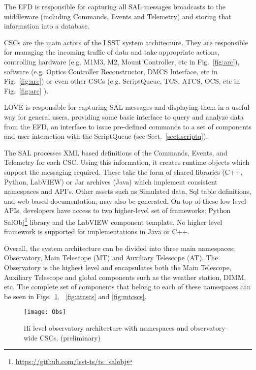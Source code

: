The EFD is responsible for capturing all SAL messages broadcasts to the middleware (including Commands, Events and Telemetry) and storing that information into a database.

CSCs are the main actors of the LSST system architecture. They are responsible for managing the incoming traffic of data and take 
appropriate actions, controlling hardware (e.g. M1M3, M2, Mount Controller, etc in Fig.~\ref{fig:arc}), software (e.g. Optics Controller 
Reconstructor, DMCS Interface, etc in Fig.~\ref{fig:arc}) or even other CSCs (e.g. ScriptQueue, TCS, ATCS, OCS, etc in 
Fig.~\ref{fig:arc} ).

LOVE is responsible for capturing SAL messages and displaying them in a useful way for general users, providing some basic interface to 
query and analyze data from the EFD, an interface to issue pre-defined commands to a set of components and user interaction with the 
ScriptQueue (see Sect.~\ref{sect:scriptq}).

The SAL processes XML based definitions of the Commands, Events, and Telemetry for each CSC. Using this information, it creates 
runtime objects which support the messaging required. These take the form of shared libraries (C++, Python, LabVIEW) or Jar archives 
(Java) which implement consistent namespaces and API's. Other assets such as Simulated data, Sql table definitions, and web based 
documentation, may also be generated. On top of these low level APIs, developers have access to two higher-level set of frameworks; 
Python SalObj\footnote{\url{https://github.com/lsst-ts/ts_salobj}} library and the LabVIEW component template. No higher level framework 
is supported for implementations in Java or C++.

Overall, the system architecture can be divided into three main namespaces; Observatory, Main Telescope (MT) and Auxiliary Telescope 
(AT). The Observatory is the highest level and encapsulates both the Main Telescope, Auxiliary Telescope and global components such
as the weather station, DIMM, etc. The complete set of components that belong to each of these namespaces can be seen in
Figs.~\ref{fig:ocs}, ~\ref{fig:atcscs} and \ref{fig:mtcscs}.

\begin{figure}
\begin{center}
\texttt{[image: Obs]}
\caption{Hi level observatory architecture with namespaces and observatory-wide CSCs. (preliminary)\label{fig:ocs}}
\end{center}
\end{figure}

